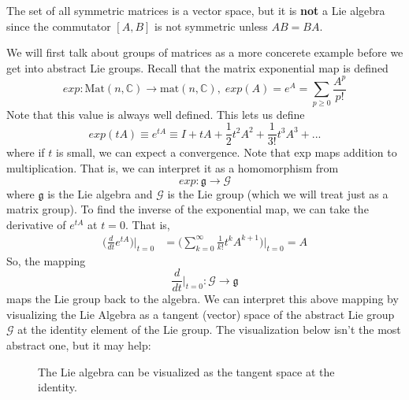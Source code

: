   \begin{example}
    The set of all symmetric matrices is a vector space, but it is \textbf{not} a Lie algebra since the commutator $[A,B]$ is not symmetric unless $A B = B A$. 
  \end{example}

  We will first talk about groups of matrices as a more concerete example before we get into abstract Lie groups. Recall that the matrix exponential map is defined
  \begin{equation}
    exp: \text{Mat}(n, \mathbb{C}) \rightarrow \text{mat}(n, \mathbb{C}), \; exp(A) = e^A = \sum_{p \geq 0} \frac{A^p}{p!}
  \end{equation}
  Note that this value is always well defined. This lets us define
  \begin{equation}
    exp(t A) \equiv e^{t A} \equiv I + tA + \frac{1}{2} t^2 A^2 + \frac{1}{3!} t^3 A^3 + ... 
  \end{equation}
  where if $t$ is small, we can expect a convergence. Note that exp maps addition to multiplication. That is, we can interpret it as a homomorphism from 
  \begin{equation}
    exp: \mathfrak{g} \rightarrow \mathcal{G}
  \end{equation}
  where $\mathfrak{g}$ is the Lie algebra and $\mathcal{G}$ is the Lie group (which we will treat just as a matrix group). To find the inverse of the exponential map, we can take the derivative of $e^{tA}$ at $t=0$. That is, 
  \begin{align*}
    \bigg(\frac{d}{d t} e^{tA} \bigg) \bigg|_{t=0} & = \bigg(\sum_{k=0}^\infty \frac{1}{k!} t^k A^{k+1} \bigg) \bigg|_{t=0} = A
  \end{align*}
  So, the mapping
  \begin{equation}
    \frac{d}{dt} \bigg|_{t=0}: \mathcal{G} \rightarrow \mathfrak{g}
  \end{equation}
  maps the Lie group back to the algebra. We can interpret this above mapping by visualizing the Lie Algebra as a tangent (vector) space of the abstract Lie group $\mathcal{G}$ at the identity element of the Lie group. The visualization below isn't the most abstract one, but it may help:

  \begin{figure}[H]
    \centering 
    \caption{The Lie algebra can be visualized as the tangent space at the identity.} 
    \label{fig:lie_algebra_tangent_space}
  \end{figure}

